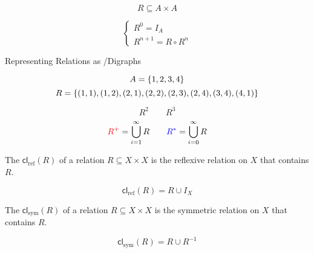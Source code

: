 
\begin{frame}{}
  \[
    R \subseteq A \times A
  \]

  \[
    \begin{cases}
      R^{0} = I_{A} \\[6pt]
      R^{n+1} = R \circ R^{n}
    \end{cases}
  \]
\end{frame}

\begin{frame}{}
  \begin{center}
    Representing Relations as /Digraphs
  \end{center}

  \[
    A = \{1, 2, 3, 4\}
  \]
  \[
    R = \{(1, 1), (1, 2), (2, 1), (2, 2), (2, 3), (2, 4), (3, 4), (4, 1)\}
  \]

  \pause
  \[
    R^{2} \qquad R^{3}
  \]
  \pause
  \[
    \textcolor{red}{R^{+}} = \bigcup_{i=1}^{\infty} R \qquad
    \textcolor{blue}{R^{\ast}} = \bigcup_{i=0}^{\infty} R
  \]
\end{frame}

\begin{frame}{}
  \begin{definition}
    The  $\textsf{cl}_{\text{ref}}(R)$
    of a relation $R \subseteq X \times X$ is
    the  reflexive relation on $X$ that contains $R$.
  \end{definition}

  \pause
  \vspace{0.50cm}
  \[
    \textsf{cl}_{\text{ref}}(R) = R \cup I_{X}
  \]
\end{frame}

\begin{frame}{}
  \begin{definition}
    The  $\textsf{cl}_{\text{sym}}(R)$
    of a relation $R \subseteq X \times X$
    is the  symmetric relation on $X$ that contains $R$.
  \end{definition}

  \pause
  \vspace{0.50cm}
  \[
    \textsf{cl}_{\text{sym}}(R) = R \cup R^{-1}
  \]
\end{frame}

